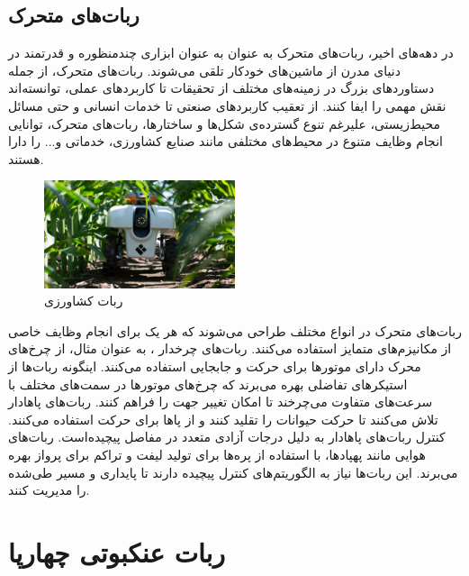 \subsection{ربات‌های متحرک}
در دهه‌های اخیر، ربات‌های متحرک
\noindent\unskip{}
به عنوان به عنوان ابزاری چندمنظوره و قدرتمند در دنیای مدرن از ماشین‌های خودکار تلقی می‌شوند. ربات‌های متحرک، از جمله دستاوردهای بزرگ در زمینه‌های مختلف از تحقیقات تا کاربردهای عملی، توانسته‌اند نقش مهمی را ایفا کنند. از تعقیب کاربردهای صنعتی تا خدمات انسانی و حتی مسائل محیط‌زیستی، علیرغم تنوع گسترده‌ی شکل‌ها و ساختارها، ربات‌های متحرک، توانایی انجام وظایف متنوع در محیط‌های مختلفی مانند صنایع کشاورزی، خدماتی و... را دارا هستند.
\begin{figure}[H]
	\centering
	\includegraphics[width=0.5\textwidth]{./images/Chapter1/AgRobot}	
	\caption[ربات کشاورزی]{ربات کشاورزی \cite{AgRobot}}
	\label{ربات کشاورزی}
\end{figure}
\noindent
\unskip

ربات‌های متحرک در انواع مختلف طراحی می‌شوند که هر یک برای انجام وظایف خاصی از مکانیزم‌های متمایز استفاده می‌کنند. ربات‌های چرخدار
\noindent\unskip{}
، به عنوان مثال، از چرخ‌های محرک دارای موتورها برای حرکت و جابجایی استفاده می‌کنند. اینگونه ربات‌ها از استیکرهای تفاضلی بهره می‌برند که چرخ‌های موتورها در سمت‌های مختلف با سرعت‌های متفاوت می‌چرخند تا امکان تغییر جهت را فراهم کنند. 
ربات‌های پاهادار
\noindent\unskip{}
تلاش می‌کنند تا حرکت حیوانات را تقلید کنند و از پاها برای حرکت استفاده می‌کنند. کنترل ربات‌های پاهادار به دلیل درجات آزادی متعدد در مفاصل پیچیده‌است. ربات‌های هوایی مانند پهپادها، با استفاده از پره‌ها برای تولید لیفت و تراکم برای پرواز بهره می‌برند. این ربات‌ها نیاز به الگوریتم‌های کنترل پیچیده دارند تا پایداری و مسیر طی‌شده را مدیریت کنند.
\cite{Craig}

\section{ربات عنکبوتی چهارپا}
